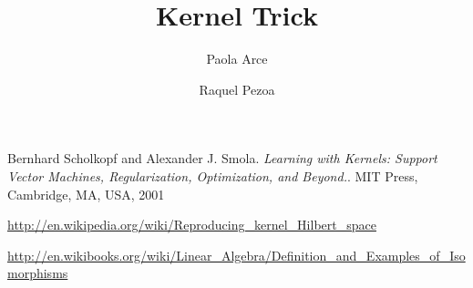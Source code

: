 \documentclass[12pt,reqno]{amsart}
\title{Kernel Trick}
\author{Paola Arce \and Raquel Pezoa}
\begin{document}
\maketitle










\begin{thebibliography}{9}

Bernhard Scholkopf and Alexander J. Smola. 
\emph{Learning with Kernels: Support Vector Machines, 
Regularization, Optimization, and Beyond.}.
MIT Press, Cambridge, MA, USA, 2001

\url{http://en.wikipedia.org/wiki/Reproducing_kernel_Hilbert_space}

\url{http://en.wikibooks.org/wiki/Linear_Algebra/Definition_and_Examples_of_Isomorphisms}

\end{thebibliography}
\end{document}
